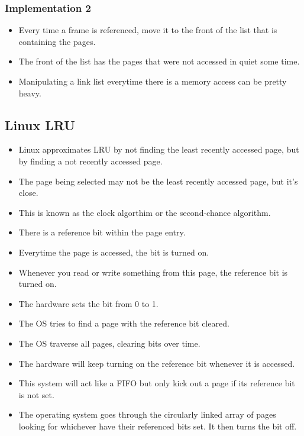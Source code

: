 \documentclass[]{article}
\begin{document}
\subsubsection{Implementation 2}
\begin{itemize}
\item Every time a frame is referenced, move it to the front of the list that is
containing the pages.
\item The front of the list has the pages that were not accessed in quiet some
time.
\item Manipulating a link list everytime there is a memory access can be pretty
heavy.
\end{itemize}

\subsection{Linux LRU}
\begin{itemize}
\item Linux approximates LRU by not finding the least recently accessed page,
but by finding a not recently accessed page.
\item The page being selected may not be the least recently accessed page, but
it's close.
\item This is known as the clock algorthim or the second-chance algorithm.
\item There is a reference bit within the page entry.
\item Everytime the page is accessed, the bit is turned on.
\item Whenever you read or write something from this page, the reference bit is
turned on.
\item The hardware sets the bit from 0 to 1.
\item The OS tries to find a page with the reference bit cleared.
\item The OS traverse all pages, clearing bits over time.
\item The hardware will keep turning on the reference bit whenever it is
accessed.
\item This system will act like a FIFO but only kick out a page if its reference
bit is not set.
\item The operating system goes through the circularly linked array of pages
looking for whichever have their referenced bits set. It then turns the bit off.
\end{itemize}
\end{document}
